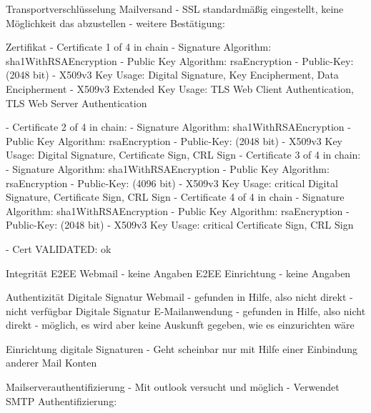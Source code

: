 \documentclass  [paper=a4,
				fontsize=12pt,
				listof=totoc,
				bibliography=totoc
				]{scrreprt}
\begin{document}
			
			
			Transportverschlüsselung Mailversand
			- SSL standardmäßig eingestellt, keine Möglichkeit das abzustellen
			- weitere Bestätigung:
			
			
			Zertifikat
			- Certificate 1 of 4 in chain
				- Signature Algorithm: sha1WithRSAEncryption
				- Public Key Algorithm: rsaEncryption
				- Public-Key: (2048 bit)
				-  X509v3 Key Usage: 
				        Digital Signature, Key Encipherment, Data Encipherment
				- X509v3 Extended Key Usage: 
				        TLS Web Client Authentication, TLS Web Server Authentication
					
			- Certificate 2 of 4 in chain:
				- Signature Algorithm: sha1WithRSAEncryption
				- Public Key Algorithm: rsaEncryption
				- Public-Key: (2048 bit)
				- X509v3 Key Usage: 
				        Digital Signature, Certificate Sign, CRL Sign
			- Certificate 3 of 4 in chain:
				- Signature Algorithm: sha1WithRSAEncryption
				- Public Key Algorithm: rsaEncryption
				- Public-Key: (4096 bit)
				- X509v3 Key Usage: critical
				        Digital Signature, Certificate Sign, CRL Sign
			- Certificate 4 of 4 in chain
				- Signature Algorithm: sha1WithRSAEncryption
				- Public Key Algorithm: rsaEncryption
				- Public-Key: (2048 bit)
			- X509v3 Key Usage: critical
			        Certificate Sign, CRL Sign
			        
			        
			-  	Cert VALIDATED: ok
			\medskip
			
			Integrität
			E2EE Webmail
			- keine Angaben
			E2EE Einrichtung
			- keine Angaben
			\medskip
			
			
			Authentizität
			Digitale Signatur Webmail
			- gefunden in Hilfe, also nicht direkt
			- nicht verfügbar %
			Digitale Signatur E-Mailanwendung
			- gefunden in Hilfe, also nicht direkt
			- möglich, es wird aber keine Auskunft gegeben, wie es einzurichten wäre
			
			
			Einrichtung digitale Signaturen
			- Geht scheinbar nur mit Hilfe einer Einbindung anderer Mail Konten
			
			
			Mailserverauthentifizierung
			- Mit outlook versucht und möglich
			- Verwendet SMTP Authentifizierung:
			\medskip
			
\end{document}
